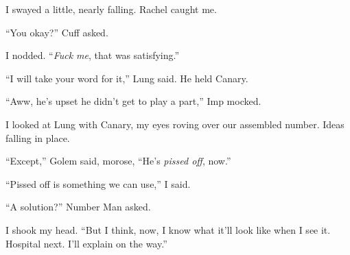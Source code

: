 I swayed a little, nearly falling.  Rachel caught me.



``You okay?'' Cuff asked.



I nodded.  ``\emph{Fuck me}, that was satisfying.''



``I will take your word for it,'' Lung said.  He held Canary.



``Aww, he's upset he didn't get to play a part,'' Imp mocked.



I looked at Lung with Canary, my eyes roving over our assembled number.  Ideas falling in place.



``Except,'' Golem said, morose, ``He's \emph{pissed off}, now.''



``Pissed off is something we can use,'' I said.



``A solution?'' Number Man asked.



I shook my head.  ``But I think, now, I know what it'll look like when I see it.  Hospital next.  I'll explain on the way.''





